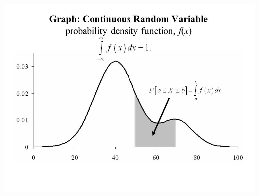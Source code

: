\documentclass{article}
\begin{document}
{{\begin{enumerate}
{                    \begin{center}{
                        \includegraphics[scale=0.3]{con-pdf.jpg}
                    }
                    \end{center}
            }
            \end{enumerate}  
        }
    }
\end{document}
